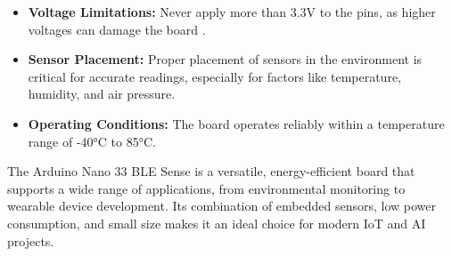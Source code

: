 	\begin{itemize}
		\item \textbf{Voltage Limitations:} Never apply more than 3.3V to the pins, as higher voltages can damage the board .
		\item \textbf{Sensor Placement:} Proper placement of sensors in the environment is critical for accurate readings, especially for factors like temperature, humidity, and air pressure.
		\item \textbf{Operating Conditions:} The board operates reliably within a temperature range of -40°C to 85°C.
	\end{itemize}
	
	The Arduino Nano 33 BLE Sense is a versatile, energy-efficient board that supports a wide range of applications, from environmental monitoring to wearable device development. Its combination of embedded sensors, low power consumption, and small size makes it an ideal choice for modern IoT and AI projects.\cite{ArduinoNano33Sense2025}
	



